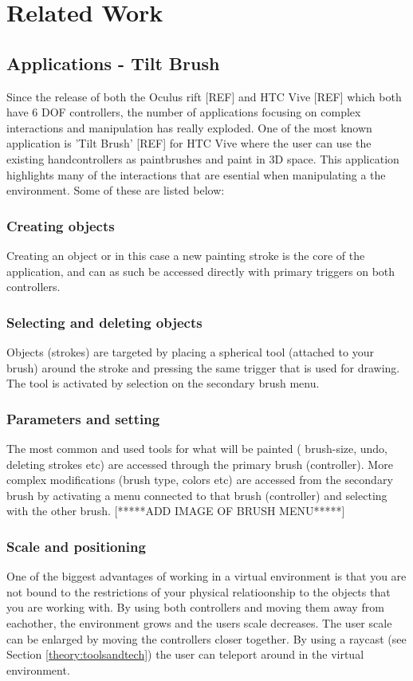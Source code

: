 \chapter{Related Work}
\section{Applications - Tilt Brush}
Since the release of both the Oculus rift [REF] and HTC Vive [REF] which both have 6 DOF controllers, the number of applications focusing on complex interactions and manipulation has really exploded. One of the most known application is 'Tilt Brush' [REF] for HTC Vive where the user can use the existing handcontrollers as paintbrushes and paint in 3D space. This application highlights many of the interactions that are esential when manipulating a the environment. Some of these are listed below:
\subsection{Creating objects}
Creating an object or in this case a new painting stroke is the core of the application, and can as such be accessed directly with primary triggers on both controllers.
\subsection{Selecting and deleting objects}
Objects (strokes) are targeted by placing a spherical tool (attached to your brush) around the stroke and pressing the same trigger that is used for drawing. The tool is activated by selection on the secondary brush menu.
\subsection{Parameters and setting}
The most common and used tools for what will be painted ( brush-size, undo, deleting strokes etc) are accessed through the primary brush (controller). More complex modifications (brush type, colors etc) are accessed from the secondary brush by activating a menu connected to that brush (controller) and selecting with the other brush.
[*****ADD IMAGE OF BRUSH MENU*****]
\subsection{Scale and positioning}
One of the biggest advantages of working in a virtual environment is that you are not bound to the restrictions of your physical relatioonship to the objects that you are working with. By using both controllers and moving them away from eachother, the environment grows and the users scale decreases. The user scale can be enlarged by moving the controllers closer together.
By using a raycast (see Section \ref{theory:toolsandtech}) the user can teleport around in the virtual environment.
